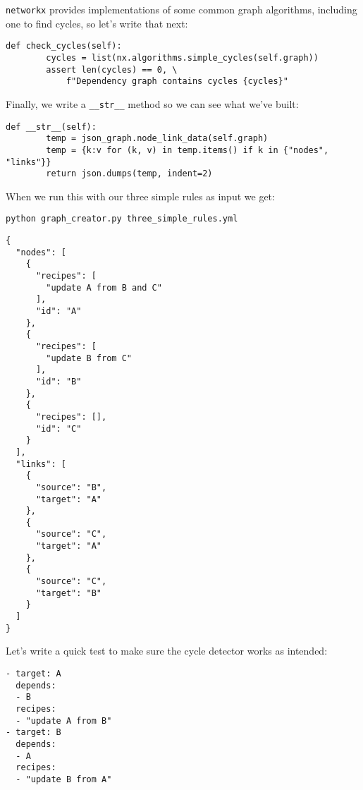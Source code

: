 \documentclass{scrbook}
\begin{document}
\texttt{networkx} provides implementations of some common graph algorithms,
including one to find cycles,
so let's write that next:


\begin{lstlisting}[frame=single,frameround=tttt]
    def check_cycles(self):
        cycles = list(nx.algorithms.simple_cycles(self.graph))
        assert len(cycles) == 0, \
            f"Dependency graph contains cycles {cycles}"
\end{lstlisting}



Finally,
we write a \texttt{\_\_str\_\_} method so we can see what we've built:


\begin{lstlisting}[frame=single,frameround=tttt]
    def __str__(self):
        temp = json_graph.node_link_data(self.graph)
        temp = {k:v for (k, v) in temp.items() if k in {"nodes", "links"}}
        return json.dumps(temp, indent=2)
\end{lstlisting}



When we run this with our three simple rules as input we get:


\begin{lstlisting}[frame=single,frameround=tttt]
python graph_creator.py three_simple_rules.yml
\end{lstlisting}



\begin{lstlisting}[frame=single,frameround=tttt]
{
  "nodes": [
    {
      "recipes": [
        "update A from B and C"
      ],
      "id": "A"
    },
    {
      "recipes": [
        "update B from C"
      ],
      "id": "B"
    },
    {
      "recipes": [],
      "id": "C"
    }
  ],
  "links": [
    {
      "source": "B",
      "target": "A"
    },
    {
      "source": "C",
      "target": "A"
    },
    {
      "source": "C",
      "target": "B"
    }
  ]
}
\end{lstlisting}



Let's write a quick test to make sure the cycle detector works as intended:


\begin{lstlisting}[frame=single,frameround=tttt]
- target: A
  depends:
  - B
  recipes:
  - "update A from B"
- target: B
  depends:
  - A
  recipes:
  - "update B from A"
\end{lstlisting}
\end{document}
